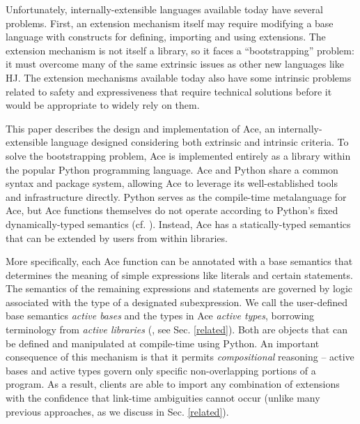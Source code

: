 \documentclass[9pt,preprint]{sigplanconf}
\begin{document}

Unfortunately, internally-extensible languages available today have several problems. First, an extension mechanism itself may require modifying a base language with constructs for defining, importing and using extensions. The extension mechanism is not itself a library, so it faces a ``bootstrapping'' problem: it must overcome many of the same extrinsic issues as other new languages like HJ. The extension mechanisms available today also have some intrinsic problems related to safety and expressiveness that require technical solutions before it would be appropriate to widely rely on them.

This paper describes the design and implementation of Ace, an internally-extensible language designed considering both extrinsic and intrinsic criteria. To solve the bootstrapping problem, Ace is implemented entirely as a library within the popular Python programming language. Ace and Python share a common syntax and package system, allowing Ace to leverage its well-established tools and infrastructure directly. Python serves as the compile-time metalanguage for Ace, but Ace functions themselves do not operate according to Python's fixed dynamically-typed semantics  (cf. \cite{Politz:2013:PFM:2509136.2509536,python}). Instead, Ace has a statically-typed semantics that can be extended by users from within libraries. 

More specifically, each Ace function can be annotated with a base semantics that determines the meaning of simple expressions like literals and certain statements. The semantics of the remaining expressions and statements are governed by logic associated with the type of a designated subexpression. We call the user-defined base semantics \emph{active bases} and the types in Ace \emph{active types}, borrowing terminology from \emph{active libraries} (\cite{activelibraries}, see Sec. \ref{related}). Both are objects that can be defined and manipulated at compile-time using Python. An important consequence of this mechanism is that it permits \emph{compositional} reasoning -- active bases and active types govern only specific non-overlapping portions of a program. As a result, clients are able to import any combination of extensions with the confidence that link-time ambiguities cannot occur (unlike many previous approaches, as we discuss in Sec. \ref{related}).
\end{document}
